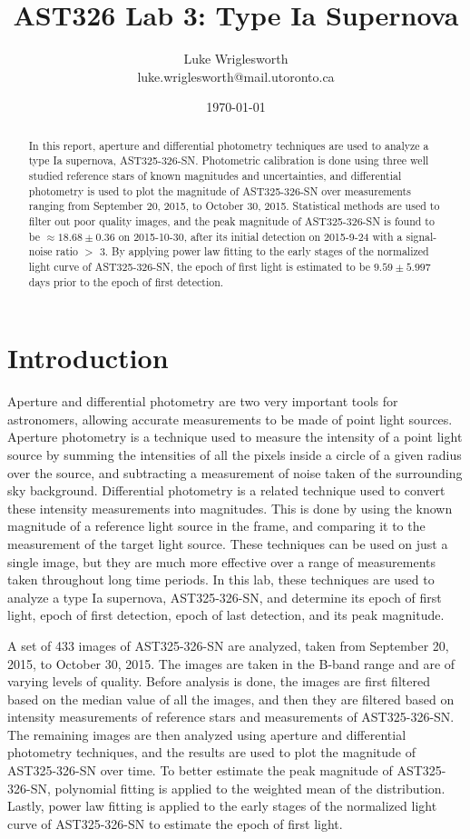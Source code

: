 \documentclass{article}
\title{AST326 Lab 3: Type Ia Supernova}
\author{Luke Wriglesworth \\ \small luke.wriglesworth@mail.utoronto.ca}
\date{\today}
\begin{document}
\maketitle

\begin{abstract}
    In this report, aperture and differential photometry techniques are used to analyze a type Ia supernova, AST325-326-SN. Photometric calibration is 
    done using three well studied reference stars of known magnitudes and uncertainties, and differential photometry is used to plot the magnitude of 
    AST325-326-SN over measurements ranging from September 20, 2015, to October 30, 2015. Statistical methods are used to filter out poor quality images, and 
    the peak magnitude of AST325-326-SN is found to be $\approx 18.68 \pm 0.36$ on 2015-10-30, after its initial detection on 2015-9-24 with a signal-noise ratio $>$ 3. By 
    applying power law fitting to the early stages of the normalized light curve of AST325-326-SN, the epoch of first light is estimated to be $9.59 \pm 5.997$ 
    days prior to the epoch of first detection. 
\end{abstract}


\section{Introduction}
Aperture and differential photometry are two very important tools for astronomers, allowing accurate measurements to be made of point light sources. Aperture photometry is a technique used to measure the intensity of a point light source
by summing the intensities of all the pixels inside a circle of a given radius over the source, and subtracting a measurement of noise taken of the surrounding sky background. Differential photometry is a related 
technique used to convert these intensity measurements into magnitudes. This is done by using the known magnitude of a reference light source
in the frame, and comparing it to the measurement of the target light source. These techniques can be used on just a single image, but they are much more effective over a range of measurements
taken throughout long time periods. In this lab, these techniques are used to analyze a type Ia supernova, AST325-326-SN, and determine its epoch of first light, epoch of first detection, epoch of 
last detection, and its peak magnitude.
    
A set of 433 images of AST325-326-SN are analyzed, taken from September 20, 2015, to October 30, 2015. The images are taken in the B-band range and are of varying levels of quality. Before
analysis is done, the images are first filtered based on the median value of all the images, and then they are filtered based on intensity measurements of reference stars and measurements of 
AST325-326-SN. The remaining images are then analyzed using aperture and differential photometry techniques, and the results are used to plot the magnitude of AST325-326-SN over time. To better
estimate the peak magnitude of AST325-326-SN, polynomial fitting is applied to the weighted mean of the distribution. Lastly, power law fitting is applied to the early stages of the normalized 
light curve of AST325-326-SN to estimate the epoch of first light.
\end{document}
